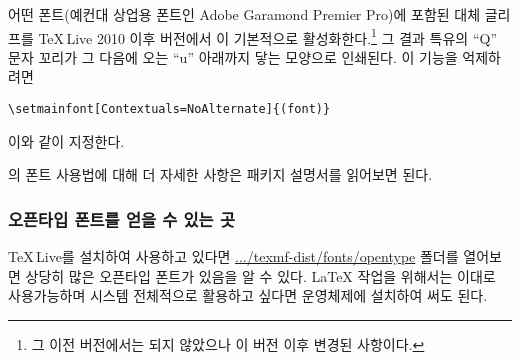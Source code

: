 어떤 폰트(예컨대 상업용 폰트인 Adobe Garamond Premier Pro)에 포함된 대체 글리프를 \TeX\,Live 2010 이후 버전에서 \XeLaTeX 이 기본적으로 활성화한다.\footnote{그 이전 버전에서는 되지 않았으나 이 버전 이후 변경된 사항이다.}
그 결과 특유의 ``Q'' 문자 꼬리가 그 다음에 오는 ``u'' 아래까지 닿는 모양으로 인쇄된다. 이 기능을 억제하려면

\begin{code}
\begin{verbatim}
\setmainfont[Contextuals=NoAlternate]{(font)}
\end{verbatim}
\end{code}
이와 같이 지정한다.

\XeLaTeX 의 폰트 사용법에 대해 더 자세한 사항은  패키지 설명서를 읽어보면 된다.

\subsubsection{오픈타입 폰트를 얻을 수 있는 곳}

\TeX\,Live를 설치하여 사용하고 있다면 \url{.../texmf-dist/fonts/opentype} 폴더를 열어보면 상당히 많은 오픈타입 폰트가 있음을 알 수 있다. \LaTeX{} 작업을 위해서는 이대로 사용가능하며 시스템 전체적으로 활용하고 싶다면 운영체제에 설치하여 써도 된다.

